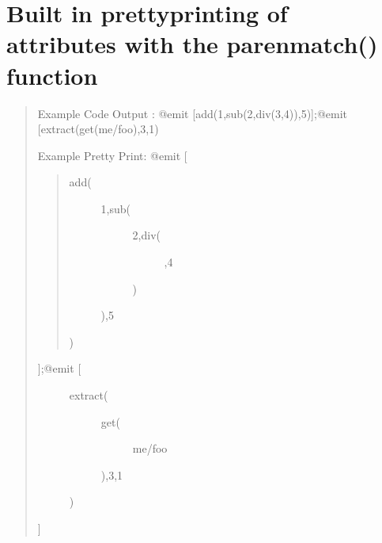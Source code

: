 \documentclass[letterpaper,10pt,english]{sphinxmanual}
\begin{document}
\section{Built in pretty\sphinxhyphen{}printing of attributes with the parenmatch() function}
\label{\detokenize{01-intro:built-in-pretty-printing-of-attributes-with-the-parenmatch-function}}\begin{quote}

\sphinxAtStartPar
Example Code Output :
@emit {[}add(1,sub(2,div(3,4)),5){]};@emit {[}extract(get(me/foo),3,1)

\sphinxAtStartPar
Example Pretty Print:
@emit {[}
\begin{quote}
\begin{description}
\item[{add(}] \leavevmode\begin{description}
\item[{1,sub(}] \leavevmode\begin{description}
\item[{2,div(}] \leavevmode
{},4

\end{description}

\sphinxAtStartPar
)

\end{description}

\sphinxAtStartPar
),5

\end{description}

\sphinxAtStartPar
)
\end{quote}
\begin{description}
\item[{{]};@emit {[}}] \leavevmode\begin{description}
\item[{extract(}] \leavevmode\begin{description}
\item[{get(}] \leavevmode
\sphinxAtStartPar
me/foo

\end{description}

\sphinxAtStartPar
),3,1

\end{description}

\sphinxAtStartPar
)

\end{description}

\sphinxAtStartPar
{]}
\end{quote}
\end{document}
